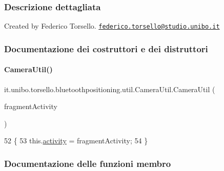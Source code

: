\subsubsection{Descrizione dettagliata}
Created by Federico Torsello. \href{mailto:federico.torsello@studio.unibo.it}{\tt federico.\+torsello@studio.\+unibo.\+it} 

\subsubsection{Documentazione dei costruttori e dei distruttori}
\hypertarget{classit_1_1unibo_1_1torsello_1_1bluetoothpositioning_1_1util_1_1CameraUtil_a0d016ada31702f7069b01740ae3bf22f_a0d016ada31702f7069b01740ae3bf22f}{}\label{classit_1_1unibo_1_1torsello_1_1bluetoothpositioning_1_1util_1_1CameraUtil_a0d016ada31702f7069b01740ae3bf22f_a0d016ada31702f7069b01740ae3bf22f} 
\paragraph{\texorpdfstring{Camera\+Util()}{CameraUtil()}}
{\footnotesize\ttfamily it.\+unibo.\+torsello.\+bluetoothpositioning.\+util.\+Camera\+Util.\+Camera\+Util (\begin{DoxyParamCaption}\item[{Fragment\+Activity}]{fragment\+Activity }\end{DoxyParamCaption})}


\begin{DoxyCode}
52                                                          \{
53         this.\hyperlink{classit_1_1unibo_1_1torsello_1_1bluetoothpositioning_1_1util_1_1CameraUtil_a06e6b6842aa57e9e9db83a88b4aa3f25_a06e6b6842aa57e9e9db83a88b4aa3f25}{activity} = fragmentActivity;
54     \}
\end{DoxyCode}


\subsubsection{Documentazione delle funzioni membro}
\hypertarget{classit_1_1unibo_1_1torsello_1_1bluetoothpositioning_1_1util_1_1CameraUtil_ad49c34169e8267bb8f841d27f0d5804b_ad49c34169e8267bb8f841d27f0d5804b}{}\label{classit_1_1unibo_1_1torsello_1_1bluetoothpositioning_1_1util_1_1CameraUtil_ad49c34169e8267bb8f841d27f0d5804b_ad49c34169e8267bb8f841d27f0d5804b} 
